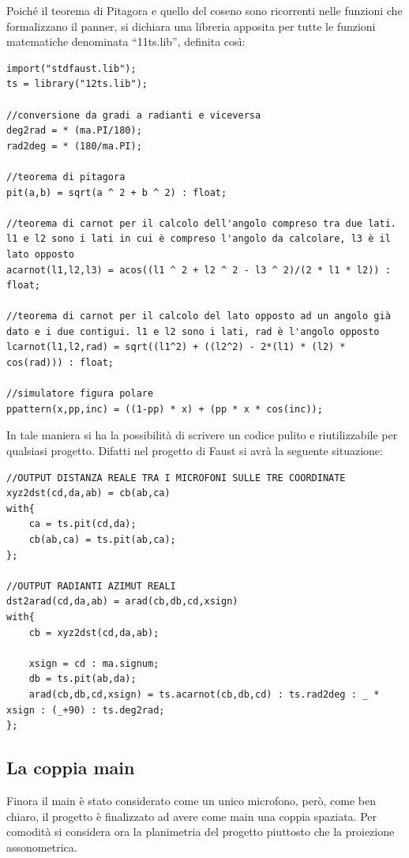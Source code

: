 \documentclass{article}
\begin{document}
    Poiché il teorema di Pitagora e quello del coseno sono ricorrenti nelle funzioni che formalizzano il panner, si dichiara una libreria apposita per tutte le funzioni matematiche denominata ``11ts.lib'', definita così:
    
    \begin{lstlisting}
import("stdfaust.lib");
ts = library("12ts.lib");

//conversione da gradi a radianti e viceversa
deg2rad = * (ma.PI/180);
rad2deg = * (180/ma.PI);

//teorema di pitagora
pit(a,b) = sqrt(a ^ 2 + b ^ 2) : float;

//teorema di carnot per il calcolo dell'angolo compreso tra due lati. l1 e l2 sono i lati in cui è compreso l'angolo da calcolare, l3 è il lato opposto
acarnot(l1,l2,l3) = acos((l1 ^ 2 + l2 ^ 2 - l3 ^ 2)/(2 * l1 * l2)) : float;

//teorema di carnot per il calcolo del lato opposto ad un angolo già dato e i due contigui. l1 e l2 sono i lati, rad è l'angolo opposto
lcarnot(l1,l2,rad) = sqrt((l1^2) + ((l2^2) - 2*(l1) * (l2) * cos(rad))) : float;

//simulatore figura polare
ppattern(x,pp,inc) = ((1-pp) * x) + (pp * x * cos(inc));
    \end{lstlisting}
    
    
    In tale maniera si ha la possibilità di scrivere un codice pulito e riutilizzabile per qualsiasi progetto.
    Difatti nel progetto di Faust si avrà la seguente situazione:
    
    \begin{lstlisting}
//OUTPUT DISTANZA REALE TRA I MICROFONI SULLE TRE COORDINATE
xyz2dst(cd,da,ab) = cb(ab,ca)
with{
    ca = ts.pit(cd,da);
    cb(ab,ca) = ts.pit(ab,ca);
};

//OUTPUT RADIANTI AZIMUT REALI
dst2arad(cd,da,ab) = arad(cb,db,cd,xsign)
with{
    cb = xyz2dst(cd,da,ab);

    xsign = cd : ma.signum;
    db = ts.pit(ab,da);
    arad(cb,db,cd,xsign) = ts.acarnot(cb,db,cd) : ts.rad2deg : _ * xsign : (_+90) : ts.deg2rad;
};
    \end{lstlisting}

    \subsection{La coppia main}
    
    Finora il main è stato considerato come un unico microfono, però, come ben chiaro, il progetto è finalizzato ad avere come main una coppia spaziata. Per comodità si considera ora la planimetria del progetto piuttosto che la proiezione assonometrica.
\end{document}
